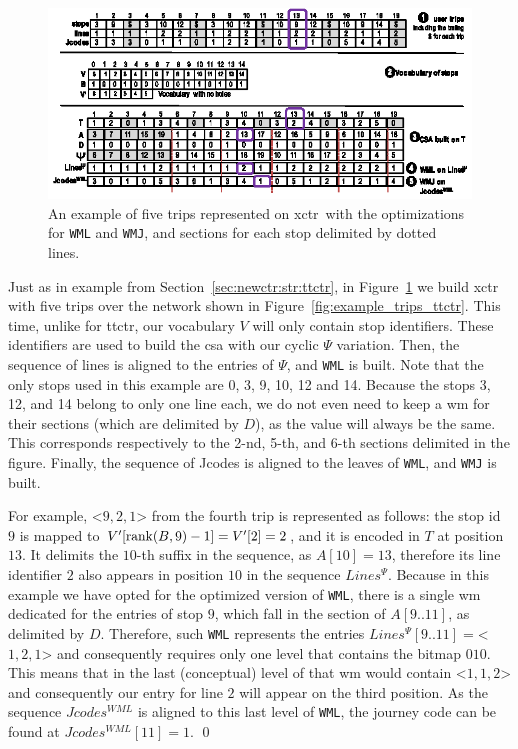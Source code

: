     \begin{figure}[ht]
    \begin{center}
    \includegraphics[width=1.00\textwidth]{figures/xctr2019.eps}
    \caption{An example of five trips represented on \acrshort{xctr}~with the optimizations for \texttt{WML} and \texttt{WMJ}, and sections for each stop delimited by dotted lines.}
    \label{fig:example_xctr}
    \end{center}
    \end{figure}
    
    \begin{example}
    Just as in example from Section~\ref{sec:newctr:str:ttctr}, in Figure~\ref{fig:example_xctr} we build \gls{xctr} with five trips over the network shown in Figure~\ref{fig:example_trips_ttctr}. This time, unlike for \gls{ttctr}, our vocabulary $V$ will only contain stop identifiers. These identifiers are used to build the \gls{csa} with our cyclic $\Psi$ variation. Then, the sequence of lines is aligned to the entries of $\Psi$, and \texttt{WML} is built. Note that the only stops used in this example are 0, 3, 9, 10, 12 and 14. Because the stops 3, 12, and 14 belong to only one line each, we do not even need to keep a \gls{wm} for their sections (which are delimited by $D$), as the value will always be the same. This corresponds respectively to the 2-nd, 5-th, and 6-th sections delimited in the figure. Finally, the sequence of Jcodes is aligned to the leaves of \texttt{WML}, and \texttt{WMJ} is built.
    
    For example, <$9,2,1$> from the fourth trip is represented as follows: the stop id $9$ is mapped to $V'[\operatorname{rank}(B,9)-1] = V'[2] = 2$, and it is encoded in $T$ at position $13$. It delimits the $10$-th suffix in the sequence, as $A[10] = 13$, therefore its line identifier $2$ also appears in position $10$ in the sequence $Lines^{\Psi}$. Because in this example we have opted for the optimized version of \texttt{WML}, there is a single \gls{wm} dedicated for the entries of stop $9$, which fall in the section of $A[9..11]$, as delimited by $D$. Therefore, such \texttt{WML} represents the entries $Lines^{\Psi}[9..11] = $<$1,2,1$> and consequently requires only one level that contains the bitmap $010$. This means that in the last (conceptual) level of that \gls{wm} would contain <$1,1,2$> and consequently our entry for line $2$ will appear on the third position. As the sequence $Jcodes^{WML}$ is aligned to this last level of \texttt{WML}, the journey code can be found at $Jcodes^{WML}[11] = 1$.
    \qed \label{ex:xctr}
    \end{example}
    
